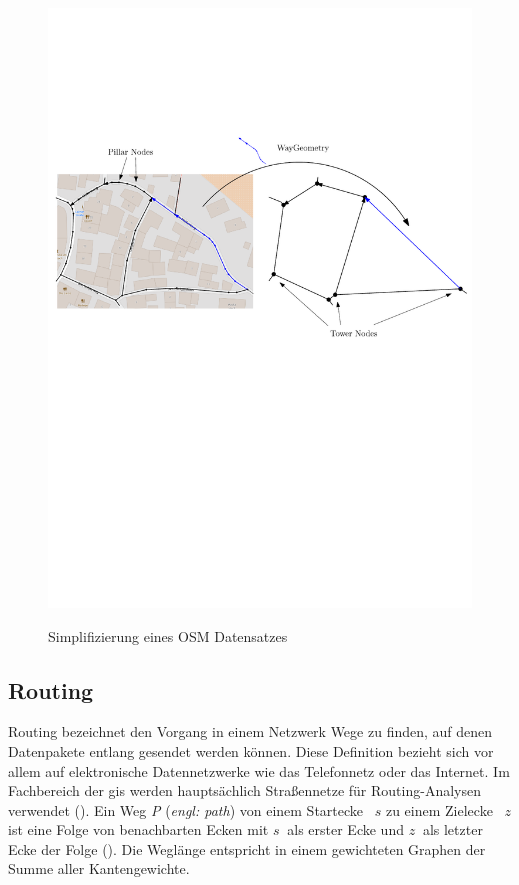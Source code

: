 \begin{figure}[h]
\centering
\includegraphics[width = \textwidth]{../media/towers.pdf} \\
\caption{Simplifizierung eines OSM Datensatzes}
\label{fig:tower}
\end{figure}

\subsection{Routing}

Routing bezeichnet den Vorgang in einem Netzwerk Wege zu finden, auf denen Datenpakete entlang gesendet werden können.
Diese Definition bezieht sich vor allem auf elektronische Datennetzwerke wie das Telefonnetz oder das Internet.
Im Fachbereich der \gls{gis} werden hauptsächlich Straßennetze für Routing-Analysen verwendet (\cite[165]{handbook}).
Ein Weg \textit{P} (\textit{engl: path}) von einem Startecke ~$s$ zu einem Zielecke ~$z$ ist eine Folge von benachbarten Ecken mit $s~$ als erster Ecke und $z~$ als letzter Ecke der Folge ().
Die Weglänge entspricht in einem gewichteten Graphen der Summe aller Kantengewichte.

